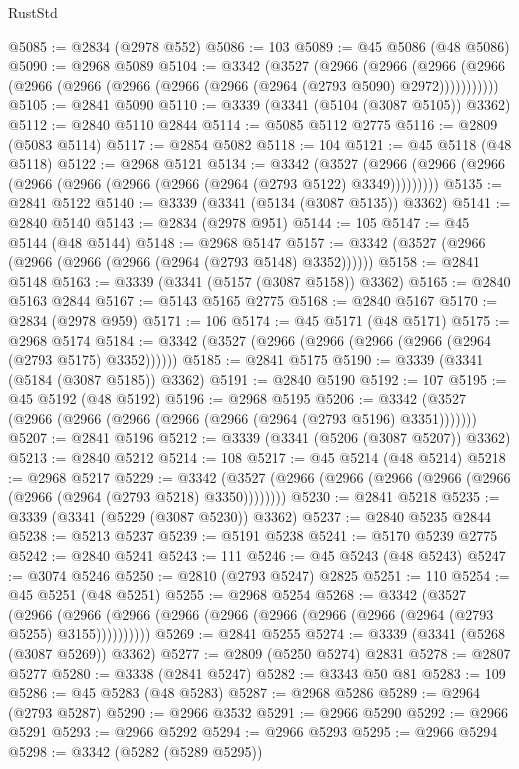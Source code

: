 \begin{lexlean}{RustStd}
\begin{coremodule}
@5085 := @2834 (@2978 @552)
@5086 := 103
@5089 := @45 @5086 (@48 @5086)
@5090 := @2968 @5089
@5104 := @3342
    (@3527
      (@2966
        (@2966
          (@2966 (@2966 (@2966 (@2966 (@2966 (@2966 (@2966 (@2964 (@2793 @5090) @2972)))))))))))
@5105 := @2841 @5090
@5110 := @3339 (@3341 (@5104 (@3087 @5105)) @3362)
@5112 := @2840 @5110 @2844
@5114 := @5085 @5112 @2775
@5116 := @2809 (@5083 @5114)
@5117 := @2854 @5082
@5118 := 104
@5121 := @45 @5118 (@48 @5118)
@5122 := @2968 @5121
@5134 := @3342
    (@3527 (@2966 (@2966 (@2966 (@2966 (@2966 (@2966 (@2966 (@2964 (@2793 @5122) @3349)))))))))
@5135 := @2841 @5122
@5140 := @3339 (@3341 (@5134 (@3087 @5135)) @3362)
@5141 := @2840 @5140
@5143 := @2834 (@2978 @951)
@5144 := 105
@5147 := @45 @5144 (@48 @5144)
@5148 := @2968 @5147
@5157 := @3342 (@3527 (@2966 (@2966 (@2966 (@2966 (@2964 (@2793 @5148) @3352))))))
@5158 := @2841 @5148
@5163 := @3339 (@3341 (@5157 (@3087 @5158)) @3362)
@5165 := @2840 @5163 @2844
@5167 := @5143 @5165 @2775
@5168 := @2840 @5167
@5170 := @2834 (@2978 @959)
@5171 := 106
@5174 := @45 @5171 (@48 @5171)
@5175 := @2968 @5174
@5184 := @3342 (@3527 (@2966 (@2966 (@2966 (@2966 (@2964 (@2793 @5175) @3352))))))
@5185 := @2841 @5175
@5190 := @3339 (@3341 (@5184 (@3087 @5185)) @3362)
@5191 := @2840 @5190
@5192 := 107
@5195 := @45 @5192 (@48 @5192)
@5196 := @2968 @5195
@5206 := @3342 (@3527 (@2966 (@2966 (@2966 (@2966 (@2966 (@2964 (@2793 @5196) @3351)))))))
@5207 := @2841 @5196
@5212 := @3339 (@3341 (@5206 (@3087 @5207)) @3362)
@5213 := @2840 @5212
@5214 := 108
@5217 := @45 @5214 (@48 @5214)
@5218 := @2968 @5217
@5229 := @3342 (@3527 (@2966 (@2966 (@2966 (@2966 (@2966 (@2966 (@2964 (@2793 @5218) @3350))))))))
@5230 := @2841 @5218
@5235 := @3339 (@3341 (@5229 (@3087 @5230)) @3362)
@5237 := @2840 @5235 @2844
@5238 := @5213 @5237
@5239 := @5191 @5238
@5241 := @5170 @5239 @2775
@5242 := @2840 @5241
@5243 := 111
@5246 := @45 @5243 (@48 @5243)
@5247 := @3074 @5246
@5250 := @2810 (@2793 @5247) @2825
@5251 := 110
@5254 := @45 @5251 (@48 @5251)
@5255 := @2968 @5254
@5268 := @3342
    (@3527
      (@2966 (@2966 (@2966 (@2966 (@2966 (@2966 (@2966 (@2966 (@2964 (@2793 @5255) @3155))))))))))
@5269 := @2841 @5255
@5274 := @3339 (@3341 (@5268 (@3087 @5269)) @3362)
@5277 := @2809 (@5250 @5274) @2831
@5278 := @2807 @5277
@5280 := @3338 (@2841 @5247)
@5282 := @3343 @50 @81
@5283 := 109
@5286 := @45 @5283 (@48 @5283)
@5287 := @2968 @5286
@5289 := @2964 (@2793 @5287)
@5290 := @2966 @3532
@5291 := @2966 @5290
@5292 := @2966 @5291
@5293 := @2966 @5292
@5294 := @2966 @5293
@5295 := @2966 @5294
@5298 := @3342 (@5282 (@5289 @5295))

\end{coremodule}
\end{lexlean}
